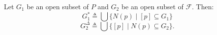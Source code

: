Let $G_1$ be an open subset of $P$ and $G_2$ be an open subset of $\mathcal{F}$. Then:
$$G_1^* \triangleq \bigcup \{N(p) \mid [p] \subseteq G_1\}$$
$$G_2^\Delta \triangleq \bigcup \{[p] \mid N(p) \subseteq G_2\}.$$
